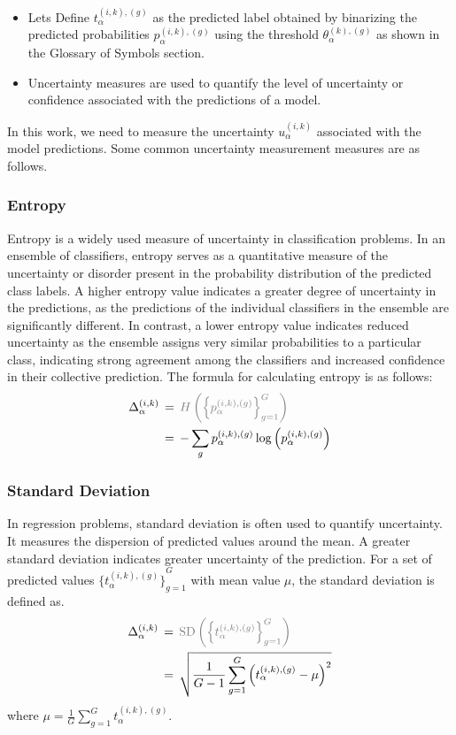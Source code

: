 \begin{itemize}
    \item Lets Define $t_{\alpha}^{(i,k),(g)} $ as the predicted label obtained by binarizing the predicted probabilities $p_{\alpha}^{ (i,k),(g)} $ using the threshold $\theta_{\alpha}^{(k),(g)} $ as shown in the Glossary of Symbols section.

    \item Uncertainty measures are used to quantify the level of uncertainty or confidence associated with the predictions of a model.
\end{itemize}

In this work, we need to measure the uncertainty $u_{\alpha}^{(i,k)}$ associated with the model predictions. Some common uncertainty measurement measures are as follows.


\subsubsection{Entropy}
Entropy is a widely used measure of uncertainty in classification problems. In an ensemble of classifiers, entropy serves as a quantitative measure of the uncertainty or disorder present in the probability distribution of the predicted class labels. A higher entropy value indicates a greater degree of uncertainty in the predictions, as the predictions of the individual classifiers in the ensemble are significantly different. In contrast, a lower entropy value indicates reduced uncertainty as the ensemble assigns very similar probabilities to a particular class, indicating strong agreement among the classifiers and increased confidence in their collective prediction. The formula for calculating entropy is as follows:
\begin{align}
    \Delta_{\alpha}^{(i,k)}
    \, & = \, \textcolor{gray}{H\left({\left\{p_{\alpha}^{(i,k),(g)}\right\}}_{g=1}^{G}\right)} \\
    \, & = \, -\sum_{g}{p_{\alpha}^{(i,k),(g)} \log\left(p_{\alpha}^{(i,k),(g)}\right)}
    \label{eq:crowd.Eq.5.uncertainty}
\end{align}

\subsubsection{Standard Deviation}
In regression problems, standard deviation is often used to quantify uncertainty. It measures the dispersion of predicted values around the mean. A greater standard deviation indicates greater uncertainty of the prediction. For a set of predicted values ${\{t_{\alpha}^{(i,k),(g)} \}}_{g=1}^G $ with mean value $\mu $, the standard deviation is defined as.
\begin{align}
\Delta_{\alpha}^{(i,k)}
\, & = \, \textcolor{gray}{\text{SD}\left({\left\{t_{\alpha}^{(i,k),(g)}\right\}}_{g=1}^G\right)} \\
\, & = \, \sqrt {\frac{1}{G-1}\sum_{g=1}^G {\left(t_{\alpha}^{(i,k),(g)}-\mu\right)}^2}
\label{eq:crowd.Eq.6.uncertainty.sd}
\end{align}
where $\mu=\frac{1}{G}\sum_{g=1}^{G}{t_{\alpha}^{(i,k),(g)}}$.

